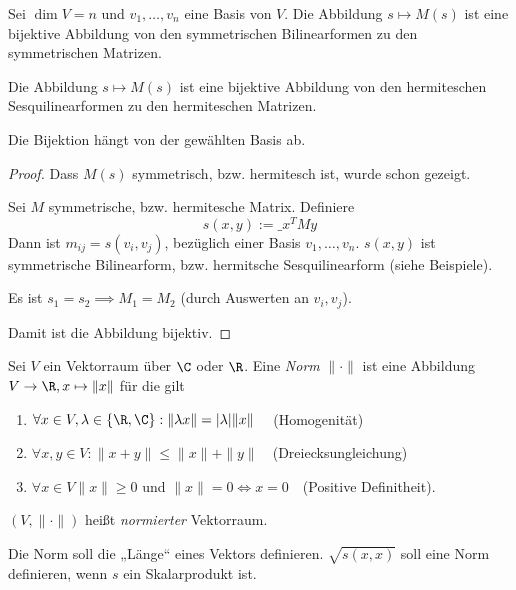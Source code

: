 \documentclass[a4paper, 10pt]{scrbook}
\begin{document}
\begin{prop}
	\label{prop:13.4}
	Sei $\dim V=n$ und $v_1,\dotsc, v_n$ eine Basis von $V$.
	Die Abbildung $s \mapsto M(s)$ ist eine bijektive Abbildung von den symmetrischen Bilinearformen zu den symmetrischen Matrizen.

	Die Abbildung $s \mapsto M(s)$ ist eine bijektive Abbildung von den hermiteschen Sesquilinearformen zu den hermiteschen Matrizen.

	\begin{note}
		Die Bijektion hängt von der gewählten Basis ab.
	\end{note}

	\begin{proof}
		Dass $M(s)$ symmetrisch, bzw. hermitesch ist, wurde schon gezeigt.

		Sei $M$ symmetrische, bzw. hermitesche Matrix.
		Definiere
		\[
			s(x,y) := \_x^TMy
		\]
		Dann ist $m_{ij} = s(v_i,v_j)$, bezüglich einer Basis $v_1,\dotsc, v_n$.
		$s(x,y)$ ist symmetrische Bilinearform, bzw. hermitsche Sesquilinearform (siehe Beispiele).

		Es ist $s_1=s_2 \implies M_1 = M_2$ (durch Auswerten an $v_i,v_j$).

		Damit ist die Abbildung bijektiv.
	\end{proof}
\end{prop}


\begin{df}
	\label{df:13.5}
	Sei $V$ ein Vektorraum über $\C$ oder $\R$.
	Eine \emph{Norm} $\|\cdot\|$ ist eine Abbildung $V\to \R, x\mapsto \|x\|$ für die gilt
	\begin{enumerate}[({N}1)]
		\item
			$\forall x\in V, \lambda \in \{\R,\C\} : \| \lambda x\| = |\lambda | \|x\|\quad$ (Homogenität)
		\item
			$\forall x,y\in V: \|x+y\| \le \|x\| + \|y\|\quad $(Dreiecksungleichung)
		\item
			$\forall x\in V \|x\| \ge 0$ und $\|x\| = 0 \iff x=0\quad $(Positive Definitheit).
	\end{enumerate}
	$(V, \|\cdot\|)$ heißt \emph{normierter} Vektorraum.

	\begin{note}
		Die Norm soll die „Länge“ eines Vektors definieren.
		$\sqrt{s(x,x)}$ soll eine Norm definieren, wenn $s$ ein Skalarprodukt ist.
	\end{note}
\end{df}
\end{document}
